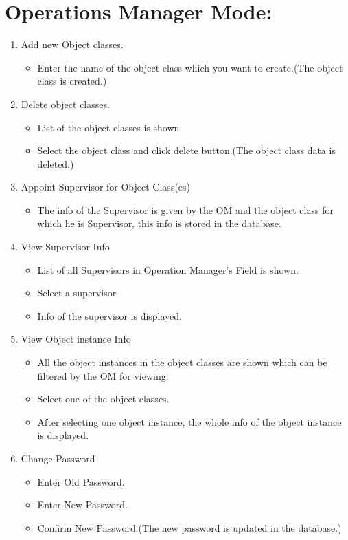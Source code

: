 \documentclass[12pt,a4paper]{article}
\begin{document}
    \newpage
    
\section{Operations Manager Mode:}

	\begin{enumerate}
	\item Add new Object classes.
	\begin{itemize}
	\item Enter the name of the object class which you want to create.(The object class is created.)
	\end{itemize}
	
	\item Delete object classes.
	\begin{itemize}
	\item List of the object classes is shown.
	\item Select the object class and click delete button.(The object class data is deleted.)
	\end{itemize}
	
	
	\item Appoint Supervisor for Object Class(es)
	\begin{itemize}
		\item The info of the Supervisor is given by the OM and the object class for which he is Supervisor, this info is stored in the database.
	\end{itemize}
	
	\item View Supervisor Info
	\begin{itemize}
	\item List of all Supervisors in Operation Manager's Field is shown.
	\item Select a supervisor
	\item Info of the supervisor is displayed. 
	\end{itemize}
	
	\item View Object instance Info
	\begin{itemize}
	\item All the object instances in the object classes are shown which can be filtered by the OM for viewing.
	\item Select one of the object classes. 
	\item After selecting one object instance, the whole info of the object instance is displayed.
	\end{itemize}
	
	\item Change Password
    \begin{itemize}
    \item Enter Old Password.
    \item Enter New Password.
    \item Confirm New Password.(The new password is updated in the database.)
    \end{itemize}
	\end{enumerate}
    
\end{document}
